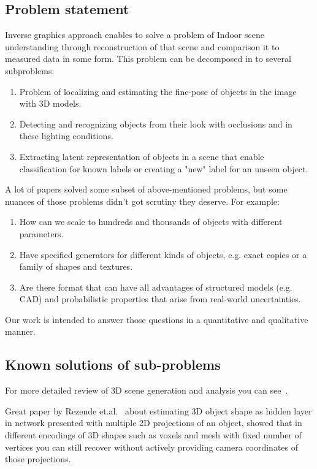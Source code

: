 \subsection{Problem statement}

Inverse graphics approach enables to solve a problem of Indoor scene understanding through reconstruction of that scene and comparison it to measured data in some form. This problem can be decomposed in to several subproblems:

\begin{enumerate}
\item Problem of localizing and estimating the fine-pose of objects in the image with 3D models.
\item Detecting and recognizing objects from their look with occlusions and in these lighting conditions.
\item Extracting latent representation of objects in a scene that enable classification for known labels or creating a "new" label for an unseen object.
\end{enumerate}

A lot of papers solved some subset of above-mentioned problems, but some nuances of those problems didn't got scrutiny they deserve. For example:

\begin{enumerate}
    \item How can we scale to hundreds and thousands of objects with different parameters.
    \item Have specified generators for different kinds of objects, e.g. exact copies or a family of shapes and textures.
    \item Are there format that can have all advantages of structured models (e.g. CAD) and probabilistic properties that arise from real-world uncertainties.
\end{enumerate}

Our work is intended to answer those questions in a quantitative and qualitative manner.

\subsection{Known solutions of sub-problems}

For more detailed review of 3D scene generation and analysis you can see~\cite{2017arXiv170609577M}.

Great paper by Rezende et.al.~\cite{rezende2016unsupervised} about estimating 3D object shape as hidden layer in network presented with multiple 2D projections of an object, showed that in different encodings of 3D shapes such as voxels and mesh with fixed number of vertices you can still recover without actively providing camera coordinates of those projections. 

